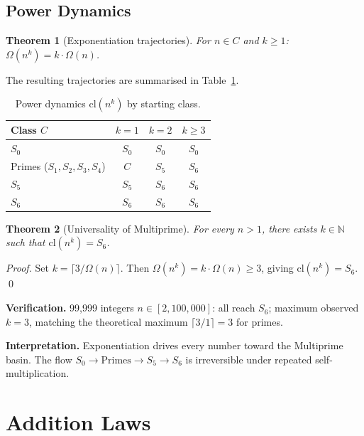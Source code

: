 \documentclass[10pt,twocolumn]{article}
\newtheorem{theorem}{Theorem}[section]
\newcommand{\cl}{\mathrm{cl}}
\newcommand{\Om}{\Omega}
\newcommand{\N}{\mathbb{N}}
\begin{document}
\subsection{Power Dynamics}

\begin{theorem}[Exponentiation trajectories]\label{thm:powerdyn}
For $n \in C$ and $k \geq 1$: $\Om(n^k) = k \cdot \Om(n)$.
\end{theorem}

The resulting trajectories are summarised in Table~\ref{tab:powerdyn}.

\begin{table}[htbp]
\centering
\caption{Power dynamics $\cl(n^k)$ by starting class.}\label{tab:powerdyn}
\small
\setlength{\tabcolsep}{4pt}
\begin{tabular}{@{}lccc@{}}
\toprule
Class $C$ & $k=1$ & $k=2$ & $k \geq 3$ \\
\midrule
$S_0$                       & $S_0$ & $S_0$ & $S_0$ \\
Primes ($S_1,S_2,S_3,S_4$) & $C$   & $S_5$ & $S_6$ \\
$S_5$                       & $S_5$ & $S_6$ & $S_6$ \\
$S_6$                       & $S_6$ & $S_6$ & $S_6$ \\
\bottomrule
\end{tabular}
\end{table}

\begin{theorem}[Universality of Multiprime]\label{thm:universality}
For every $n > 1$, there exists $k \in \N$ such that $\cl(n^k) = S_6$.
\end{theorem}
\begin{proof}
Set $k = \lceil 3/\Om(n) \rceil$. Then
$\Om(n^k) = k \cdot \Om(n) \geq 3$, giving $\cl(n^k) = S_6$. \qed
\end{proof}

\noindent\textbf{Verification.} 99{,}999 integers $n \in [2, 100{,}000]$:
all reach $S_6$; maximum observed $k = 3$, matching the theoretical
maximum $\lceil 3/1 \rceil = 3$ for primes.

\smallskip\noindent\textbf{Interpretation.} Exponentiation drives every
number toward the Multiprime basin. The flow
$S_0 \to \text{Primes} \to S_5 \to S_6$ is irreversible under repeated
self-multiplication.

\section{Addition Laws}
\end{document}
